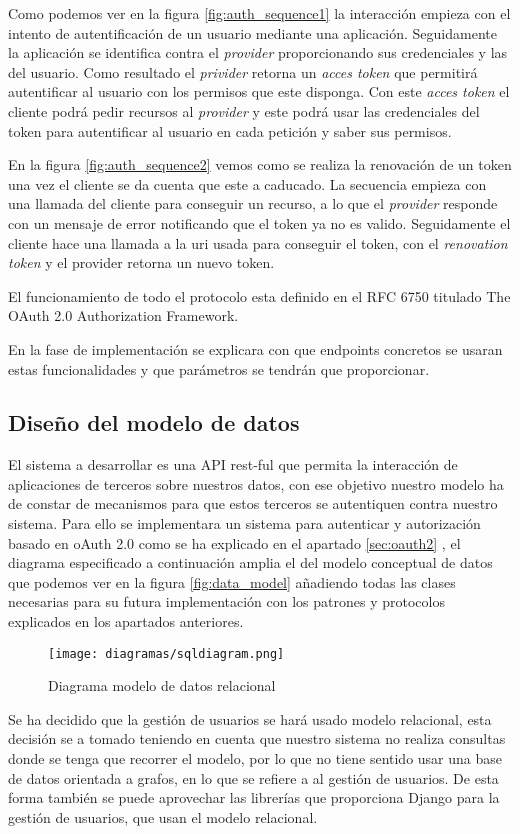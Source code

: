Como podemos ver en la figura \ref{fig:auth_sequence1} la interacción empieza con el intento de autentificación de un usuario mediante una aplicación. Seguidamente la aplicación se identifica contra el \textit{provider} proporcionando sus credenciales y las del usuario. Como resultado el \textit{privider} retorna un \textit{acces token} que permitirá autentificar al usuario con los permisos que este disponga. Con este \textit{acces token} el cliente podrá pedir recursos al \textit{provider} y este podrá usar las credenciales del token para autentificar al usuario en cada petición y saber sus permisos.

En la figura \ref{fig:auth_sequence2} vemos como se realiza la renovación de un token una vez el cliente se da cuenta que este a caducado. La secuencia empieza con una llamada del cliente para conseguir un recurso, a lo que el \textit{provider} responde con un mensaje de error notificando que el token ya no es valido. Seguidamente el cliente hace una llamada a la uri usada para conseguir el token, con el \textit{renovation token} y el provider retorna un nuevo token.

El funcionamiento de todo el protocolo esta definido en el RFC 6750 titulado The OAuth 2.0 Authorization Framework\cite{oauth2rfc}.

En la fase de implementación se explicara con que endpoints concretos se usaran estas funcionalidades y que parámetros se tendrán que proporcionar.

\subsection{Diseño del modelo de datos}
\label{sec:diseno_modelo_datos}
El sistema a desarrollar es una API rest-ful que permita la interacción de aplicaciones de terceros sobre nuestros datos, con ese objetivo nuestro modelo ha de constar de mecanismos para que estos terceros se autentiquen contra nuestro sistema. Para ello se implementara un sistema para autenticar y autorización basado en oAuth 2.0 como se ha explicado en el apartado \ref{sec:oauth2} , el diagrama especificado a continuación amplia el del modelo conceptual de datos que podemos ver en la figura \ref{fig:data_model} añadiendo todas las clases necesarias para su futura implementación con los patrones y protocolos explicados en los apartados anteriores.

\begin{figure}[ht!]
\center
\texttt{[image: diagramas/sqldiagram.png]}
\caption{Diagrama modelo de datos relacional}
\label{fig:sqldiagram}
\end{figure}
\newpage
Se ha decidido que la gestión de usuarios se hará usado modelo relacional, esta decisión se a tomado teniendo en cuenta que nuestro sistema no realiza consultas donde se tenga que recorrer el modelo, por lo que no tiene sentido usar una base de datos orientada a grafos, en lo que se refiere a al gestión de usuarios. De esta forma también se puede aprovechar las librerías que proporciona Django para la gestión de usuarios, que usan el modelo relacional.

